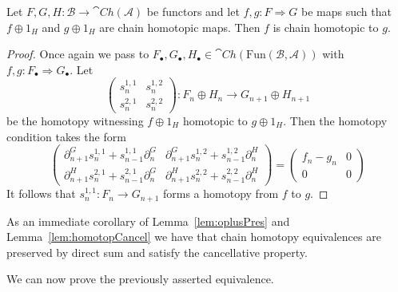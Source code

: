 \begin{lem}[label=lem:homotopCancel]
    Let $F,G,H:\mathcal{B}\to \cat{Ch}(\mathcal{A})$ be functors and let $f,g:F\Rightarrow G$ be maps such that $f\oplus 1_H$ and $g\oplus 1_H$ are chain homotopic maps. Then $f$ is chain homotopic to $g$.
\end{lem}
\begin{proof}
    Once again we pass to $F_\bullet,G_\bullet,H_\bullet\in \cat{Ch}(\text{Fun}(\mathcal{B},\mathcal{A}))$ with $f,g:F_\bullet\Rightarrow G_\bullet$. Let 
    \begin{equation*}
        \begin{pmatrix} s_n^{1,1} & s_n^{1,2} \\ s_n^{2,1} & s_n^{2,2} \end{pmatrix}:F_n\oplus H_n\to G_{n+1}\oplus H_{n+1}
    \end{equation*}
    be the homotopy witnessing $f\oplus 1_H$ homotopic to $g\oplus 1_H$. Then the homotopy condition takes the form
    \begin{equation*}
        \begin{pmatrix} \partial_{n+1}^Gs_n^{1,1}+s_{n-1}^{1,1}\partial_n^G & \partial_{n+1}^Gs_n^{1,2}+s_{n-1}^{1,2}\partial_n^H \\ \partial_{n+1}^Hs_n^{2,1}+s_{n-1}^{2,1}\partial_n^G & \partial_{n+1}^Hs_n^{2,2}+s_{n-1}^{2,2}\partial_n^H \end{pmatrix} = \begin{pmatrix} f_n-g_n & 0 \\ 0 & 0 \end{pmatrix}
    \end{equation*}
    It follows that $s_n^{1,1}:F_n\to G_{n+1}$ forms a homotopy from $f$ to $g$.
\end{proof}

As an immediate corollary of Lemma~\ref{lem:oplusPres} and Lemma~\ref{lem:homotopCancel} we have that chain homotopy equivalences are preserved by direct sum and satisfy the cancellative property.

We can now prove the previously asserted equivalence.


